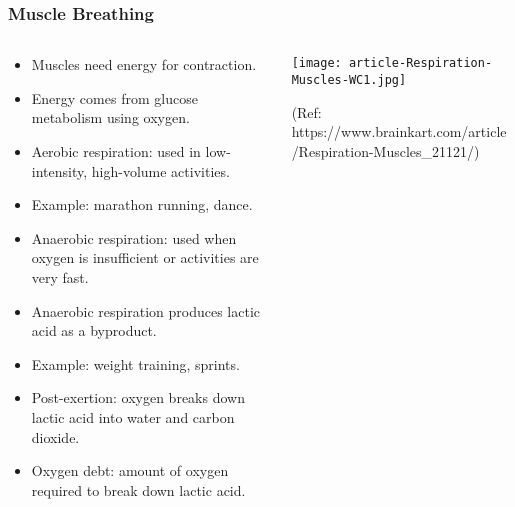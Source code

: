 \begin{frame}[fragile]\frametitle{Muscle Breathing}
\begin{columns}
    \begin{column}[T]{0.5\linewidth}
      \begin{itemize}
		\item Muscles need energy for contraction.
		\item Energy comes from glucose metabolism using oxygen.
		\item Aerobic respiration: used in low-intensity, high-volume activities.
		\item Example: marathon running, dance.
		\item Anaerobic respiration: used when oxygen is insufficient or activities are very fast.
		\item Anaerobic respiration produces lactic acid as a byproduct.
		\item Example: weight training, sprints.
		\item Post-exertion: oxygen breaks down lactic acid into water and carbon dioxide.
		\item Oxygen debt: amount of oxygen required to break down lactic acid.
	  \end{itemize}
    \end{column}
    \begin{column}[T]{0.5\linewidth}
		\begin{center}
		\texttt{[image: article-Respiration-Muscles-WC1.jpg]}
				
		{\tiny (Ref: https://www.brainkart.com/article/Respiration-Muscles\_21121/)}
		\end{center}	
    \end{column}
  \end{columns}
\end{frame}

